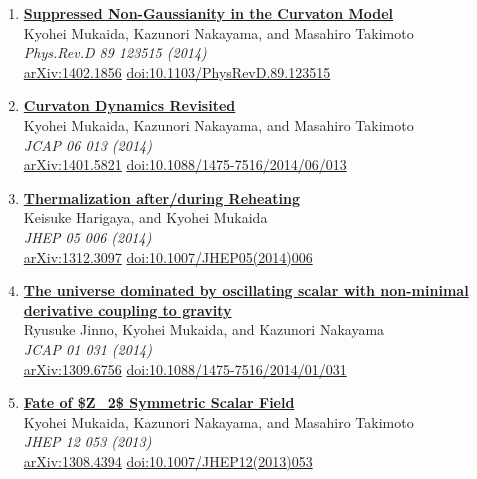 \begin{enumerate}
\item \textbf{\href{https://arxiv.org/abs/1402.1856}{Suppressed Non-Gaussianity in the Curvaton Model}}\\
Kyohei Mukaida, Kazunori Nakayama, and Masahiro Takimoto\\
\emph{Phys.Rev.D 89 123515 (2014)}
\\ \href{https://arxiv.org/abs/1402.1856}{arXiv:1402.1856} \href{https://doi.org/10.1103/PhysRevD.89.123515}{doi:10.1103/PhysRevD.89.123515}

\item \textbf{\href{https://arxiv.org/abs/1401.5821}{Curvaton Dynamics Revisited}}\\
Kyohei Mukaida, Kazunori Nakayama, and Masahiro Takimoto\\
\emph{JCAP 06 013 (2014)}
\\ \href{https://arxiv.org/abs/1401.5821}{arXiv:1401.5821} \href{https://doi.org/10.1088/1475-7516/2014/06/013}{doi:10.1088/1475-7516/2014/06/013}

\item \textbf{\href{https://arxiv.org/abs/1312.3097}{Thermalization after/during Reheating}}\\
Keisuke Harigaya, and Kyohei Mukaida\\
\emph{JHEP 05 006 (2014)}
\\ \href{https://arxiv.org/abs/1312.3097}{arXiv:1312.3097} \href{https://doi.org/10.1007/JHEP05(2014)006}{doi:10.1007/JHEP05(2014)006}

\item \textbf{\href{https://arxiv.org/abs/1309.6756}{The universe dominated by oscillating scalar with non-minimal derivative coupling to gravity}}\\
Ryusuke Jinno, Kyohei Mukaida, and Kazunori Nakayama\\
\emph{JCAP 01 031 (2014)}
\\ \href{https://arxiv.org/abs/1309.6756}{arXiv:1309.6756} \href{https://doi.org/10.1088/1475-7516/2014/01/031}{doi:10.1088/1475-7516/2014/01/031}

\item \textbf{\href{https://arxiv.org/abs/1308.4394}{Fate of \$Z\_2\$ Symmetric Scalar Field}}\\
Kyohei Mukaida, Kazunori Nakayama, and Masahiro Takimoto\\
\emph{JHEP 12 053 (2013)}
\\ \href{https://arxiv.org/abs/1308.4394}{arXiv:1308.4394} \href{https://doi.org/10.1007/JHEP12(2013)053}{doi:10.1007/JHEP12(2013)053}


\end{enumerate}
